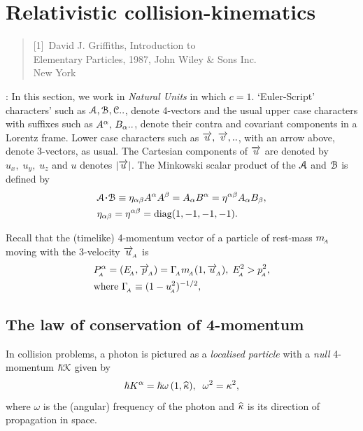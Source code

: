 \newpage

\section{Relativistic collision-kinematics}
\begin{small}
\begin{quote}

[1]~David J. Griffiths, {Introduction to\\ Elementary
Particles}, 1987, John Wiley \& Sons Inc.\\ New York
\end{quote}
\end{small}

: In this section, we work in 
\textsl{Natural 
Units} in which  $ c=1$.  `Euler-Script' characters' 
such as $\EuScript{A},\EuScript{B},  \EuScript{C}..$,  
denote  4-vectors and the usual upper case  characters 
with suffixes such as $A^{{\alpha}}, \,B_ {{\alpha}}..$, denote 
their 
contra and covariant components in a Lorentz frame. 
Lower 
case characters such as $\overrightarrow{u},\, \overrightarrow{v}, ..$, 
with an 
arrow above, denote 3-vectors, as usual. The Cartesian 
components of $\overrightarrow{u}$ are denoted by 
$u_x,\;u_y,\;u_z$ 
and 
$u$ denotes $ |\overrightarrow{u}|$. The Minkowski scalar product 
of 
the $\EuScript{A}$ and $\EuScript{B}$ is defined  by
\begin{align}\label{pm53}
&\EuScript{A}\minp\EuScript{B}\equiv
\eta_{\gka\gkb}{A}^\gka {A}^\gkb = A_ \gka B^\gka= 
\eta^{\gka\gkb}{A}_ \gka B_\gkb,\notag\\
&\eta_{\gka\gkb}=\eta^{\gka\gkb}=\diag(1,-1,-1,-1).
\end{align}

Recall that the (timelike) 4-momentum vector of a 
particle 
of rest-mass $ m_{_{\hspace*{-1.5pt}{A}}}$ moving with the 3-velocity $ 
\overrightarrow{u}_{_{\hspace*{-1.5pt}{A}}}$ is
\begin{align}\label{pm54}
&P_{_{\hspace*{-1.5pt}{A}}}^{{\alpha}} =(E_{_{\hspace*{-1.5pt}{A}}},\overrightarrow{p}_{_{\hspace*{-1.5pt}{A}}})=
\Gamma_{_{\hspace*{-1.5pt}{A}}} m_{_{\hspace*{-1.5pt}{A}}}(1, \overrightarrow{u}_{_{\hspace*{-1.5pt}{A}}}),\;
E_{_{\hspace*{-1.5pt}{A}}}^2> p_{_{\hspace*{-1.5pt}{A}}}^2, \notag\\&\text{where 
}\Gamma_{_{\hspace*{-1.5pt}{A}}} \equiv  (1-u_{_{\hspace*{-1.5pt}{A}}}^2)^{-1/2},
\end{align}
\subsection{The law of conservation of  4-momentum}
In  collision problems, a {photon} is pictured as a 
\textsl{localised particle} with  a \textsl{null} 
4-momentum 
$\hslash \EuScript{K}$ given by
\begin{align}\label{pm55}
\hslash{K}^{{\alpha}}=\hslash\omega\,(1,{\widehat{{\kappa}}}),
\;\;\omega^2={\kappa}^2,
\end{align}
where $\omega$ is the {(angular) frequency} of the 
photon 
and  ${\widehat{{\kappa}}}$ is its {direction of propagation} in 
space.

